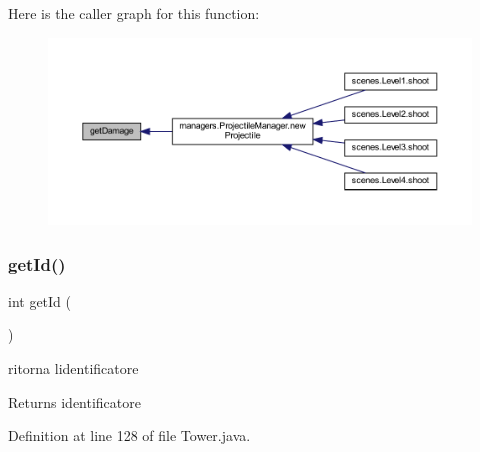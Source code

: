 Here is the caller graph for this function\+:\nopagebreak
\begin{figure}[H]
\begin{center}
\leavevmode
\includegraphics[width=350pt]{classtowers_1_1_tower_ac10b854131d21646691dcdd7da559a22_icgraph}
\end{center}
\end{figure}
\mbox{\label{classtowers_1_1_tower_a67283be3f45257d1e0c474c563ebb6b6}} 
\subsubsection{\texorpdfstring{get\+Id()}{getId()}}
{\footnotesize\ttfamily int get\+Id (\begin{DoxyParamCaption}{ }\end{DoxyParamCaption})}



ritorna l\textquotesingle{}identificatore 

\begin{DoxyReturn}{Returns}
identificatore 
\end{DoxyReturn}


Definition at line 128 of file Tower.\+java.

